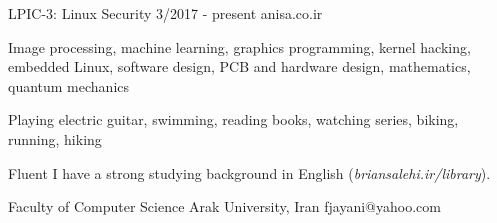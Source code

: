 \documentclass[a4paper,12pt]{memoir} %
\begin{document}
{LPIC-3: Linux Security}
{3/2017 - present}
{}
{anisa.co.ir}


\Sep %




{Image processing, machine learning, graphics programming, kernel hacking, embedded Linux, software design, PCB and hardware design, mathematics, quantum mechanics}


{Playing electric guitar, swimming, reading books, watching series, biking, running, hiking}


\Sep %




{Fluent}
{I have a strong studying background in English (\textit{briansalehi.ir/library}).}


\Sep %




{Faculty of Computer Science}
{Arak University, Iran}
{fjayani@yahoo.com}


\Sep %
\end{document}
